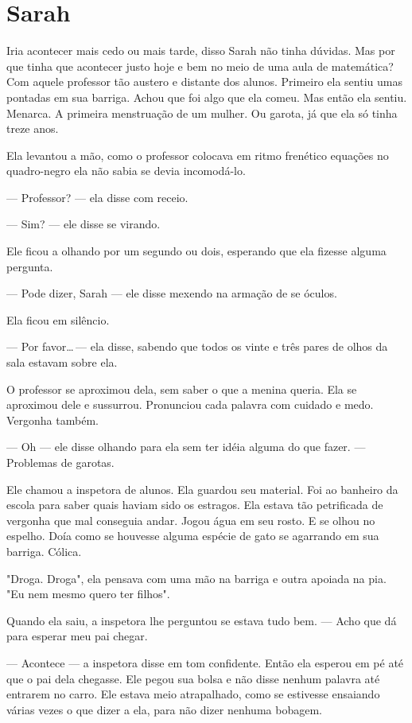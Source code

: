\chapter{Sarah}

Iria acontecer mais cedo ou mais tarde, disso Sarah não tinha dúvidas. Mas por que tinha que acontecer justo hoje e bem no meio de uma aula de matemática? Com aquele professor tão austero e distante dos alunos. Primeiro ela sentiu umas pontadas em sua barriga. Achou que foi algo que ela comeu. Mas então ela sentiu.  Menarca. A primeira menstruação de um mulher. Ou garota, já que ela só tinha treze anos.

Ela levantou a mão, como o professor colocava em ritmo frenético equações no quadro-negro ela não sabia se devia incomodá-lo.

--- Professor? --- ela disse com receio.

--- Sim? --- ele disse se virando.

Ele ficou a olhando por um segundo ou dois, esperando que ela fizesse alguma pergunta.

--- Pode dizer, Sarah --- ele disse mexendo na armação de se óculos.

Ela ficou em silêncio.

--- Por favor\ldots\,--- ela disse, sabendo que todos os vinte e três pares de olhos da sala estavam sobre ela.

O professor se aproximou dela, sem saber o que a menina queria. Ela se aproximou dele e sussurrou. Pronunciou cada palavra com cuidado e medo. Vergonha também.

--- Oh --- ele disse olhando para ela sem ter idéia alguma do que fazer. --- Problemas de garotas.

Ele chamou a inspetora de alunos. Ela guardou seu material. Foi ao banheiro da escola para saber quais haviam sido os estragos. Ela estava tão petrificada de vergonha que mal conseguia andar. Jogou água em seu rosto. E se olhou no espelho. Doía como se houvesse alguma espécie de gato se agarrando em sua barriga. Cólica.

"Droga. Droga", ela pensava com uma mão na barriga e outra apoiada na pia. "Eu nem mesmo quero ter filhos".

Quando ela saiu, a inspetora lhe perguntou se estava tudo bem.
--- Acho que dá para esperar meu pai chegar.

--- Acontece --- a inspetora disse em tom confidente.
Então ela esperou em pé até que o pai dela chegasse. Ele pegou sua bolsa e não disse nenhum palavra até entrarem no carro. Ele estava meio atrapalhado, como se estivesse ensaiando várias vezes o que dizer a ela, para não dizer nenhuma bobagem.

